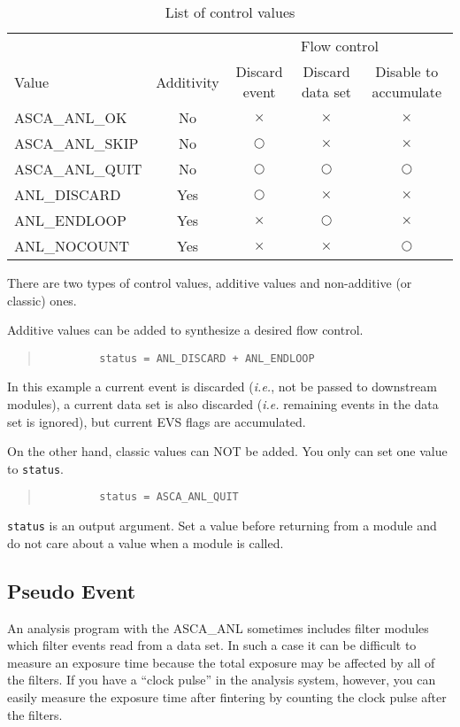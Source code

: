 \begin{table}[htb]
\begin{tabular}{|l|c|c|c|c|}
\hline
 & & \multicolumn{3}{|c|}{Flow control} \\
Value & Additivity & Discard event & Discard data set & 
Disable to accumulate \\
 \hline
ASCA\_ANL\_OK   & No  & $\times$   & $\times$   & $\times$   \\
ASCA\_ANL\_SKIP & No  & $\bigcirc$ & $\times$   & $\times$   \\
ASCA\_ANL\_QUIT & No  & $\bigcirc$ & $\bigcirc$ & $\bigcirc$ \\
ANL\_DISCARD    & Yes & $\bigcirc$ & $\times$   & $\times$   \\
ANL\_ENDLOOP    & Yes & $\times$   & $\bigcirc$ & $\times$   \\
ANL\_NOCOUNT    & Yes & $\times$   & $\times$   & $\bigcirc$ \\ \hline
\end{tabular}
\caption{List of control values}
\label{tab:status}
\end{table}

There are two types of control values,
additive values and non-additive (or classic) ones.

Additive values can be added to synthesize a desired flow control.
\begin{quote}\baselineskip 3.2mm\begin{verbatim}
         status = ANL_DISCARD + ANL_ENDLOOP
\end{verbatim}\end{quote}
In this example
a current event is discarded
({\em i.e.}, not be passed to downstream modules),
a current data set is also discarded
({\em i.e.} remaining events in the data set is ignored),
but current EVS flags are accumulated.

On the other hand,
classic values can NOT be added.
You only can set one value to {\tt status}.
\begin{quote}\baselineskip 3.2mm\begin{verbatim}
         status = ASCA_ANL_QUIT
\end{verbatim}\end{quote}

{\tt status} is an output argument.
Set a value before returning from a module
and do not care about a value when a module is called.

\subsection{Pseudo Event}\label{sec:pseudo-event}
An analysis program with the ASCA\_ANL sometimes includes filter modules
which filter events read from a data set.
In such a case
it can be difficult to measure an exposure time
because the total exposure may be affected by all of the filters.
If you have a ``clock pulse'' in the analysis system,
however,
you can easily measure the exposure time after fintering
by counting the clock pulse after the filters.

